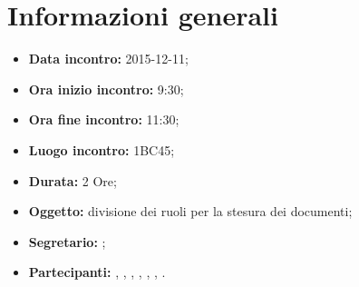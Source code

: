 \newpage
\section{Informazioni generali}
\begin{itemize}
\item \textbf{Data incontro:} 2015-12-11;
\item \textbf{Ora inizio incontro:} 9:30;
\item \textbf{Ora fine incontro:} 11:30;
\item \textbf{Luogo incontro:} 1BC45;
\item \textbf{Durata:} 2 Ore;
\item \textbf{Oggetto:} divisione dei ruoli per la stesura dei documenti;
\item \textbf{Segretario:} \GN;
\item \textbf{Partecipanti:} \AF, \FB, \GN, \GR, \MV, \MP, \SM.

\end{itemize}
